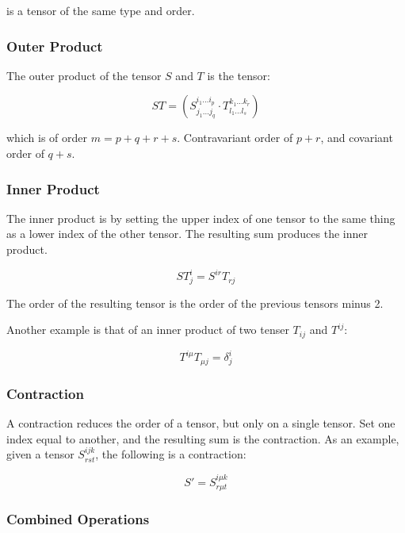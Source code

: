 \documentclass{article}
\begin{document}
\noindent
is a tensor of the same type and order.

\subsubsection{Outer Product}

The outer product of the tensor $S$ and $T$ is the tensor:

\begin{equation*}
	ST = ( S^{i_1...i_p}_{j_1...j_q} \cdot T^{k_1...k_r}_{l_1...l_s} )
\end{equation*}

which is of order $m = p + q + r + s$.  Contravariant order of $p + r$, and covariant order of $q + s$.

\subsubsection{Inner Product}

The inner product is by setting the upper index of one tensor to the same thing as a lower index of the other tensor.  The resulting sum produces the inner product.

\begin{equation*}
	ST^i_j = S^{i r} T_{r j}
\end{equation*}

\noindent
The order of the resulting tensor is the order of the previous tensors minus 2.

Another example is that of an inner product of two tenser $T_{ij}$ and $T^{ij}$:

\begin{equation*}
	T^{i \mu} T_{\mu j} = \delta^i_j
\end{equation*}

\subsubsection{Contraction}

A contraction reduces the order of a tensor, but only on a single tensor.  Set one index equal to another, and the resulting sum is the contraction.  As an example,
given a tensor $S^{ijk}_{rst}$, the following is a contraction:

\begin{equation*}
	S' = S^{i \mu k}_{r \mu t}
\end{equation*}

\subsubsection{Combined Operations}
\end{document}
